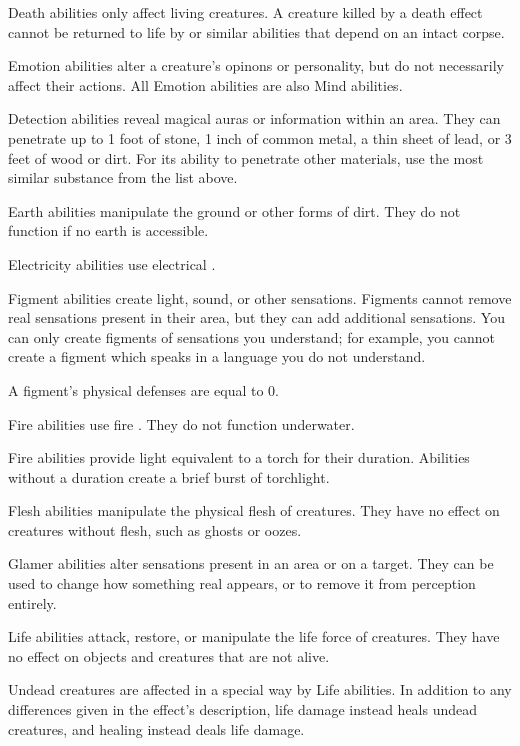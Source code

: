          Death abilities only affect living creatures.
        A creature killed by a death effect cannot be returned to life by  or similar abilities that depend on an intact corpse.

         Emotion abilities alter a creature's opinons or personality, but do not necessarily affect their actions.
        All Emotion abilities are also Mind abilities.

         Detection abilities reveal magical auras or information within an area.
        They can penetrate up to 1 foot of stone, 1 inch of common metal, a thin sheet of lead, or 3 feet of wood or dirt.
        For its ability to penetrate other materials, use the most similar substance from the list above.

         Earth abilities manipulate the ground or other forms of dirt.
        They do not function if no earth is accessible.

         Electricity abilities use electrical .

         Figment abilities create light, sound, or other sensations.
        Figments cannot remove real sensations present in their area, but they can add additional sensations.
        You can only create figments of sensations you understand; for example, you cannot create a figment which speaks in a language you do not understand.
        \par A figment's physical defenses are equal to 0.

         Fire abilities use fire . They do not function underwater.
        \par Fire abilities provide light equivalent to a torch for their duration.
        Abilities without a duration create a brief burst of torchlight.

         Flesh abilities manipulate the physical flesh of creatures.
        They have no effect on creatures without flesh, such as ghosts or oozes.

         Glamer abilities alter sensations present in an area or on a target.
        They can be used to change how something real appears, or to remove it from perception entirely.

         Life abilities attack, restore, or manipulate the life force of creatures.
        They have no effect on objects and creatures that are not alive.
        \par Undead creatures are affected in a special way by Life abilities.
        In addition to any differences given in the effect's description, life damage instead heals undead creatures, and healing instead deals life damage.

